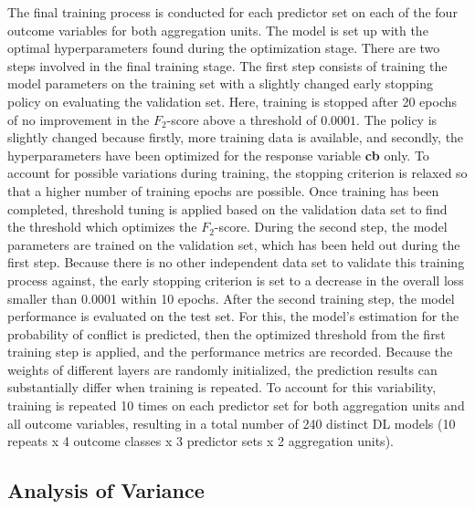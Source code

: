 \documentclass[a4paper,11pt]{article}
\begin{document}
The final training process is conducted for each predictor set on each of the
four outcome variables for both aggregation units. The model is set up with the
optimal hyperparameters found during the optimization stage. There are two steps
involved in the final training stage. The first step consists of training the
model parameters on the training set with a slightly changed early stopping
policy on evaluating the validation set. Here, training is stopped after
20 epochs of no improvement in the \(F_2\)-score above a threshold of \(0.0001\).
The policy is slightly changed because firstly, more training data is available,
and secondly, the hyperparameters have been optimized for the response variable
\textbf{cb} only. To account for possible variations during training, the stopping
criterion is relaxed so that a higher number of training epochs are possible.
Once training has been completed, threshold tuning is applied based on the
validation data set to find the threshold which optimizes the \(F_2\)-score.
During the second step, the model parameters are trained on the
validation set, which has been held out during the first step. Because there is
no other independent data set to validate this training process against, the early
stopping criterion is set to a decrease in the overall loss smaller than 0.0001
within 10 epochs. After the second training step, the model performance is evaluated
on the test set. For this, the model's estimation for the probability of conflict
is predicted, then the optimized threshold from the first training step is applied,
and the performance metrics are recorded. Because the weights of different layers
are randomly initialized, the prediction results can substantially
differ when training is repeated. To account for this variability, training
is repeated 10 times on each predictor set for both aggregation units and
all outcome variables, resulting in a total number of 240 distinct DL models
(10 repeats x 4 outcome classes x 3 predictor sets x 2 aggregation units).

\hypertarget{analysis-of-variance}{%
\subsection{Analysis of Variance}\label{analysis-of-variance}}
\end{document}
